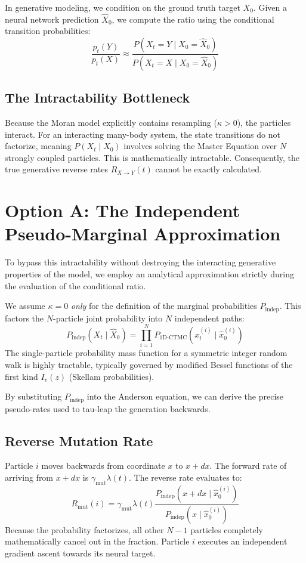 \documentclass[11pt]{article}
\begin{document}
In generative modeling, we condition on the ground truth target $X_0$. Given a neural network prediction $\hat{X}_0$, we compute the ratio using the conditional transition probabilities:
\[
    \frac{p_t(Y)}{p_t(X)} \approx \frac{P(X_t=Y \mid X_0=\hat{X}_0)}{P(X_t=X \mid X_0=\hat{X}_0)}
\]

\subsection{The Intractability Bottleneck}
Because the Moran model explicitly contains resampling ($\kappa > 0$), the particles interact. For an interacting many-body system, the state transitions do not factorize, meaning $P(X_t \mid X_0)$ involves solving the Master Equation over $N$ strongly coupled particles. This is mathematically intractable. Consequently, the true generative reverse rates $R_{X \to Y}(t)$ cannot be exactly calculated.

\section{Option A: The Independent Pseudo-Marginal Approximation}

To bypass this intractability without destroying the interacting generative properties of the model, we employ an analytical approximation strictly during the evaluation of the conditional ratio.

We assume $\kappa = 0$ \textit{only} for the definition of the marginal probabilities $P_{\text{indep}}$. This factors the $N$-particle joint probability into $N$ independent paths:
\[
    P_{\text{indep}}(X_t \mid \hat{X}_0) = \prod_{i=1}^N P_{\text{1D-CTMC}}(x_t^{(i)} \mid \hat{x}_0^{(i)})
\]
The single-particle probability mass function for a symmetric integer random walk is highly tractable, typically governed by modified Bessel functions of the first kind $I_v(z)$ (Skellam probabilities).

By substituting $P_{\text{indep}}$ into the Anderson equation, we can derive the precise pseudo-rates used to tau-leap the generation backwards.

\subsection{Reverse Mutation Rate}
Particle $i$ moves backwards from coordinate $x$ to $x + dx$. The forward rate of arriving from $x+dx$ is $\gamma_{\text{mut}} \lambda(t)$. The reverse rate evaluates to:
\[
    R_{\text{mut}}(i) = \gamma_{\text{mut}} \lambda(t) \frac{P_{\text{indep}}(x+dx \mid \hat{x}_0^{(i)})}{P_{\text{indep}}(x \mid \hat{x}_0^{(i)})}
\]
Because the probability factorizes, all other $N-1$ particles completely mathematically cancel out in the fraction. Particle $i$ executes an independent gradient ascent towards its neural target.
\end{document}
